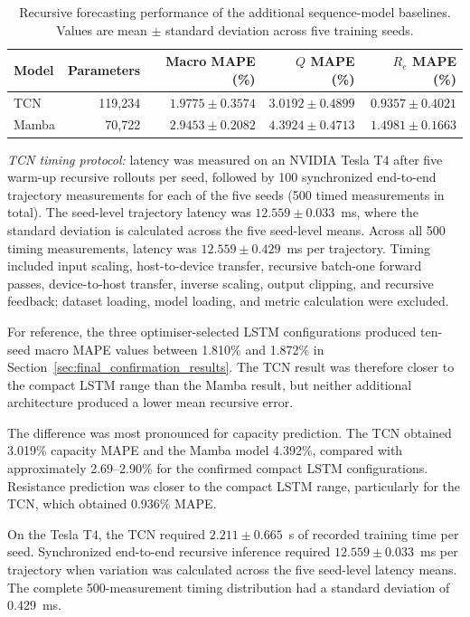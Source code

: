 \documentclass[a4paper,fleqn]{cas-sc}
\begin{document}
\begin{table}[htbp]
\centering
\caption{Recursive forecasting performance of the additional sequence-model
baselines. Values are mean $\pm$ standard deviation across five training
seeds.}
\label{tab:sequence_baseline_results}
\begin{tabular}{lrrrr}
\toprule
\textbf{Model} &
\textbf{Parameters} &
\textbf{Macro MAPE (\%)} &
\textbf{$Q$ MAPE (\%)} &
\textbf{$R_e$ MAPE (\%)} \\
\midrule
TCN &
119,234 &
$1.9775 \pm 0.3574$ &
$3.0192 \pm 0.4899$ &
$0.9357 \pm 0.4021$ \\

Mamba &
70,722 &
$2.9453 \pm 0.2082$ &
$4.3924 \pm 0.4713$ &
$1.4981 \pm 0.1663$ \\
\bottomrule
\end{tabular}

\vspace{1mm}
\parbox{0.96\linewidth}{\footnotesize
\textit{TCN timing protocol:} latency was measured on an NVIDIA Tesla T4
after five warm-up recursive rollouts per seed, followed by 100 synchronized
end-to-end trajectory measurements for each of the five seeds (500 timed
measurements in total). The seed-level trajectory latency was
$12.559\pm0.033$~ms, where the standard deviation is calculated across the
five seed-level means. Across all 500 timing measurements, latency was
$12.559\pm0.429$~ms per trajectory. Timing included input scaling,
host-to-device transfer, recursive batch-one forward passes,
device-to-host transfer, inverse scaling, output clipping, and recursive
feedback; dataset loading, model loading, and metric calculation were
excluded.}
\end{table}

For reference, the three optimiser-selected LSTM configurations produced ten-seed macro MAPE values between 1.810\% and 1.872\% in Section~\ref{sec:final_confirmation_results}. The TCN result was therefore closer to the compact LSTM range than the Mamba result, but neither additional architecture produced a lower mean recursive error.

The difference was most pronounced for capacity prediction. The TCN obtained 3.019\% capacity MAPE and the Mamba model 4.392\%, compared with approximately 2.69--2.90\% for the confirmed compact LSTM configurations. Resistance prediction was closer to the compact LSTM range, particularly for the TCN, which obtained 0.936\% MAPE.

On the Tesla T4, the TCN required $2.211\pm0.665$~s of recorded training
time per seed. Synchronized end-to-end recursive inference required
$12.559\pm0.033$~ms per trajectory when variation was calculated across the
five seed-level latency means. The complete 500-measurement timing
distribution had a standard deviation of 0.429~ms.
\end{document}
